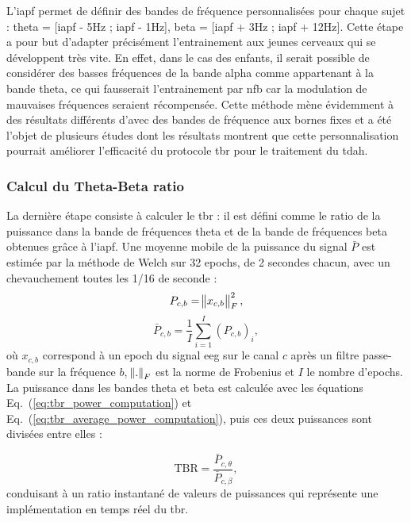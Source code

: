 L'\gls{iapf} permet de définir des bandes de fréquence personnalisées pour chaque sujet : theta = [\gls{iapf} - 5Hz ; \gls{iapf} - 1Hz], beta = [\gls{iapf} + 3Hz ; \gls{iapf} + 12Hz].
Cette étape a pour but d'adapter précisément l'entrainement aux jeunes cerveaux qui se développent très vite. En effet, dans le cas des enfants, il serait possible de considérer 
des basses fréquences de la bande alpha comme appartenant à la bande theta, ce qui fausserait l'entrainement par \gls{nfb} car la modulation de mauvaises fréquences 
seraient récompensée. Cette méthode mène évidemment à des résultats différents d'avec des bandes de fréquence aux bornes fixes \citep{Arns2008, Vollebregt2015} et a été 
l'objet de plusieurs études \citep{Kaiser2001, Bazanova2006, Vollebregt2015} dont les résultats montrent que cette personnalisation pourrait améliorer l'efficacité du protocole
\gls{tbr} pour le traitement du \gls{tdah}.

\subsubsection{Calcul du Theta-Beta ratio}
La dernière étape consiste à calculer le \gls{tbr} : il est défini comme le ratio de la puissance dans la bande de fréquences theta et de la bande de fréquences beta obtenues 
grâce à l'\gls{iapf}. Une moyenne mobile de la puissance du signal $\bar{P}$ est estimée par la méthode de Welch \citep{Welch1967} sur 32 epochs, de 2 secondes chacun, avec un 
chevauchement toutes les 1/16 de seconde :
\begin{equation}
\label{eq:tbr_power_computation}
P_{c,b} = \norm{ x_{c,b} }_{F}^2,
\end{equation}
\begin{equation}
\label{eq:tbr_average_power_computation}
\bar{P}_{c,b} = \frac{1}{I} \sum_{i=1}^{I} (P_{c,b})_{i},
\end{equation}
où $x_{c,b}$ correspond à un epoch du signal \gls{eeg} sur le canal $c$ après un filtre passe-bande sur la fréquence $b$, $\norm{.}_{F}$ est la norme de Frobenius et $I$ 
le nombre d'epochs. La puissance dans les bandes theta et beta est calculée avec les équations Eq.~(\ref{eq:tbr_power_computation}) et Eq.~(\ref{eq:tbr_average_power_computation}),
puis ces deux puissances sont divisées entre elles :

\begin{equation}
\label{eq:tbr_tbr_computation}
\text{TBR} = \frac{\bar{P}_{c,\theta}}{\bar{P}_{c,\beta}},
\end{equation}
conduisant à un ratio instantané de valeurs de puissances qui représente une implémentation en temps réel du \gls{tbr}.

